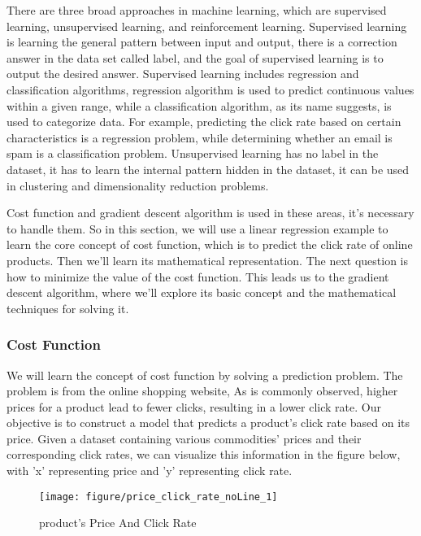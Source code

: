 \documentclass{article}
\begin{document}
    There are three broad approaches in machine learning, which are supervised learning, unsupervised learning, and reinforcement learning. Supervised learning is learning the general pattern between input and output, there is a correction answer in the data set called label, and the goal of supervised learning is to output the desired answer. Supervised learning includes regression and classification algorithms, regression algorithm is used to predict continuous values within a given range, while a classification algorithm, as its name suggests, is used to categorize data. For example, predicting the click rate based on certain characteristics is a regression problem, while determining whether an email is spam is a classification problem. Unsupervised learning has no label in the dataset, it has to learn the internal pattern hidden in the dataset, it can be used in clustering and dimensionality reduction problems.


    Cost function and gradient descent algorithm is used in these areas, it's necessary to handle them. So in this section, we will use a linear regression example to learn the core concept of cost function, which is to predict the click rate of online products. Then we'll learn its mathematical representation. The next question is how to minimize the value of the cost function. This leads us to the gradient descent algorithm, where we'll explore its basic concept and the mathematical techniques for solving it.


    \newpage
	\subsubsection{Cost Function}
     We will learn the concept of cost function by solving a prediction problem. The problem is from the online shopping website, As is commonly observed, higher prices for a product lead to fewer clicks, resulting in a lower click rate. Our objective is to construct a model that predicts a product's click rate based on its price. Given a dataset containing various commodities' prices and their corresponding click rates, we can visualize this information in the figure below, with 'x' representing price and 'y' representing click rate.


     \begin{figure}[htbp]
        \centering
        \texttt{[image: figure/price\_click\_rate\_noLine\_1]}
        \caption{product's Price And Click Rate}
     \end{figure}
\end{document}
